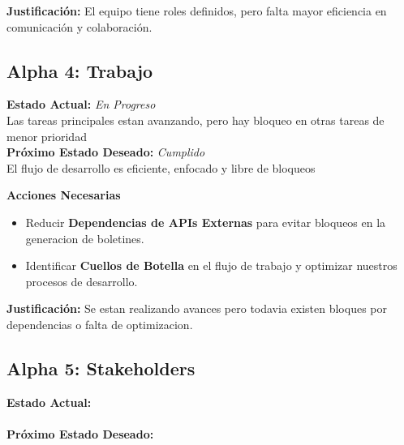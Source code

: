 \documentclass[12pt]{article}
\begin{document}
\vspace{0.1cm}

\textbf{Justificación:} El equipo tiene
roles definidos, pero falta mayor
eficiencia en comunicación y colaboración.

\vspace{0.3cm}

\subsection{Alpha 4: Trabajo}

\textbf{Estado Actual:} \textit{En Progreso} \\
\hspace*{1cm} Las tareas principales estan
avanzando, pero hay bloqueo en otras tareas
de menor prioridad \\
\textbf{Próximo Estado Deseado:} \textit{Cumplido} \\
\hspace*{1cm} El flujo de desarrollo es
eficiente, enfocado y libre de bloqueos

\vspace{0.1cm}

\textbf{Acciones Necesarias}
\begin{itemize}
    \item Reducir \textbf{Dependencias de APIs Externas}
          para evitar bloqueos en la generacion
          de boletines.
    \item Identificar \textbf{Cuellos de Botella}
          en el flujo de trabajo y optimizar nuestros
          procesos de desarrollo.
\end{itemize}

\vspace{0.1cm}

\textbf{Justificación:} Se estan realizando
avances pero todavia existen bloques por
dependencias o falta de optimizacion.

\vspace{0.3cm}

\subsection{Alpha 5: Stakeholders}

\textbf{Estado Actual:} \textit{} \\
\hspace*{1cm} \\
\textbf{Próximo Estado Deseado:} \textit{} \\
\hspace*{1cm}
\end{document}
